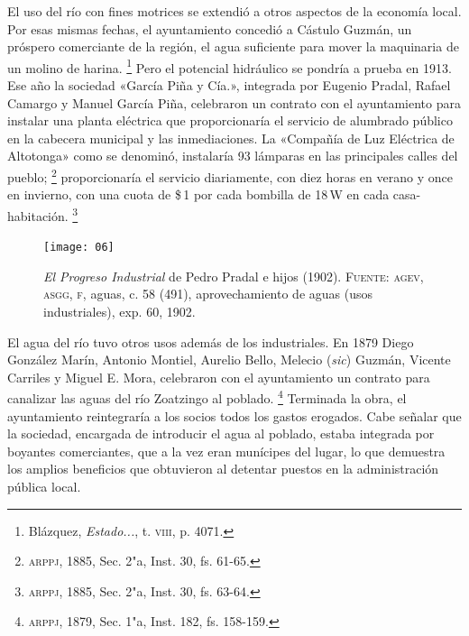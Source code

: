 \documentclass[14pt,twoside,final]{extbook} %
\let\oldfootnote\footnote
\renewcommand\footnote[1]{%
\oldfootnote{\hspace{1mm}#1}}
\begin{document}
El uso del río con fines motrices se extendió a otros aspectos de la economía local. Por esas mismas fechas, el ayuntamiento concedió a Cástulo Guzmán, un próspero comerciante de la región, el agua suficiente para mover la maquinaria de un molino de harina.\footnote{Blázquez, \emph{Estado...}, t. \textsc{viii}, p. 4071.} Pero el potencial hidráulico se pondría a prueba en 1913. Ese año la sociedad «García Piña y Cía.», integrada por Eugenio Pradal, Rafael Camargo y Manuel García Piña, celebraron un contrato con el ayuntamiento para instalar una planta eléctrica que proporcionaría el servicio de alumbrado público en la cabecera municipal y las inmediaciones. La «Compañía de Luz Eléctrica de Altotonga» como se denominó, instalaría 93 lámparas en las principales calles del pueblo;\footnote{\textsc{arppj}, 1885, Sec. 2"a, Inst. 30, fs. 61-65.} proporcionaría el servicio diariamente, con diez horas en verano y once en invierno, con una cuota de \$\,1 por cada bombilla de 18\,W en cada casa-habitación.\footnote{\textsc{arppj}, 1885, Sec. 2"a, Inst. 30, fs. 63-64.}
\begin{figure}
\centering
\texttt{[image: 06]}
\caption[\emph{El Progreso Industrial} de Pedro Pradal e hijos (1902)]{\emph{El Progreso Industrial} de Pedro Pradal e hijos (1902). \textsc{Fuente:} \textsc{agev, asgg, f}, aguas, c. 58 (491), aprovechamiento de aguas (usos industriales), exp. 60, 1902.}
\label{fig:progreso-industrial}
\end{figure}

El agua del río tuvo otros usos además de los industriales. En 1879 Diego González Marín, Antonio Montiel, Aurelio Bello, Melecio (\emph{sic}) Guzmán, Vicente Carriles y Miguel E. Mora, celebraron con el ayuntamiento un contrato para canalizar las aguas del río Zoatzingo al poblado.\footnote{\textsc{arppj}, 1879, Sec. 1"a, Inst. 182, fs. 158-159.} Terminada la obra, el ayuntamiento reintegraría a los socios todos los gastos erogados. Cabe señalar que la sociedad, encargada de introducir el agua al poblado, estaba integrada por boyantes comerciantes, que a la vez eran munícipes del lugar, lo que demuestra los amplios beneficios que obtuvieron al detentar puestos en la administración pública local.
\end{document}
